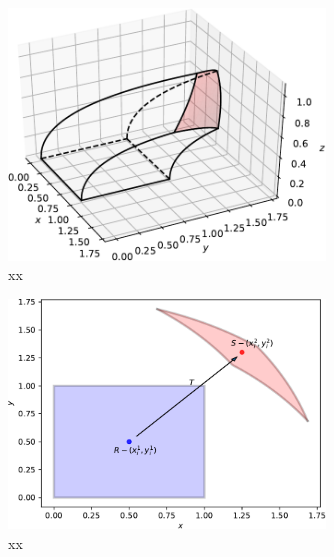 \documentclass{article}
\theoremstyle{theorem}
\theoremstyle{definition}
\begin{document}
\begin{table}
\begin{center}
\begin{tabular}{|l l l l l l l l|}
\end{tabular}
 
\end{center}

\end{table}




 

\begin{figure}[htb]
\centering
\includegraphics[width=0.75\textwidth]{sphere_solid.pdf}
\caption{xx}
\label{fig:sphere_solid}
\end{figure}

\begin{figure}[htb]
\centering
\includegraphics[width=0.75\textwidth]{sphere_regions.pdf}
\caption{xx}
\label{fig:sphere_regions}
\end{figure}
\end{document}
